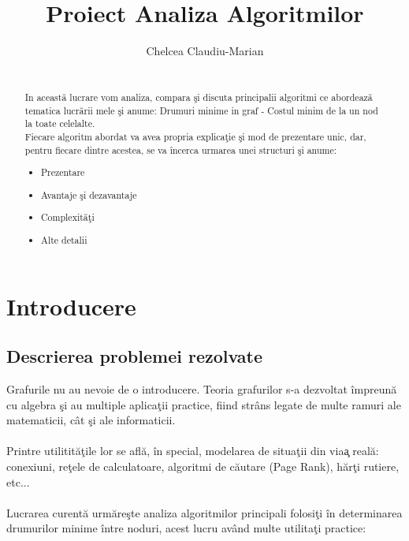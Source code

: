 \documentclass[runningheads]{llncs}
\title{Proiect Analiza Algoritmilor}
\author{Chelcea Claudiu-Marian\orcidID{322CA}}
\institute{Universitatea Politehnica din Bucure\c{s}ti\\Facultatea de Automatic\u{a} \c{s}i Calculatoare\\ \email{claudiuchelcea01@gmail.com}}
\begin{document}
\maketitle             

\begin{abstract}
\^\\{I}n aceast\u{a} lucrare vom analiza, compara \c{s}i discuta principalii algoritmi ce abordeaz\u{a} tematica lucr\u{a}rii mele \c{s}i anume: Drumuri minime in graf - Costul minim de la un nod la toate celelalte. \\

Fiecare algoritm abordat va avea propria explica\c{t}ie \c{s}i mod de prezentare unic, dar, pentru fiecare dintre acestea, se va \^{i}ncerca urmarea unei structuri \c{s}i anume: \\

\begin{itemize}
	\item Prezentare
	\item Avantaje \c{s}i dezavantaje
	\item Complexit\u{a}\c{t}i
	\item Alte detalii
\end{itemize}

\end{abstract}
%
%
%
%
%
\section{Introducere}
\subsection{Descrierea problemei rezolvate}
\hspace{6pt}Grafurile nu au nevoie de o introducere. Teoria grafurilor s-a dezvoltat \^{i}mpreun\u{a} cu algebra \c{s}i au multiple aplicaţii practice, fiind strâns legate de multe ramuri ale matematicii, c\^{a}t \c{s}i ale informaticii. 
\paragraph{} Printre utilitit\u{a}\c{t}ile lor se afl\u{a}, \^{i}n special, modelarea de situa\c{t}ii din via\c{a} real\u{a}: conexiuni, re\c{t}ele de calculatoare, algoritmi de c\u{a}utare (Page Rank), h\u{a}r\c{t}i rutiere, etc... 

\paragraph{} Lucrarea curent\u{a} urm\u{a}re\c{s}te analiza algoritmilor principali folosi\c{t}i \^{i}n determinarea drumurilor minime \^{i}ntre noduri, acest lucru av\^{a}nd multe utilita\c{t}i practice:
\end{document}
